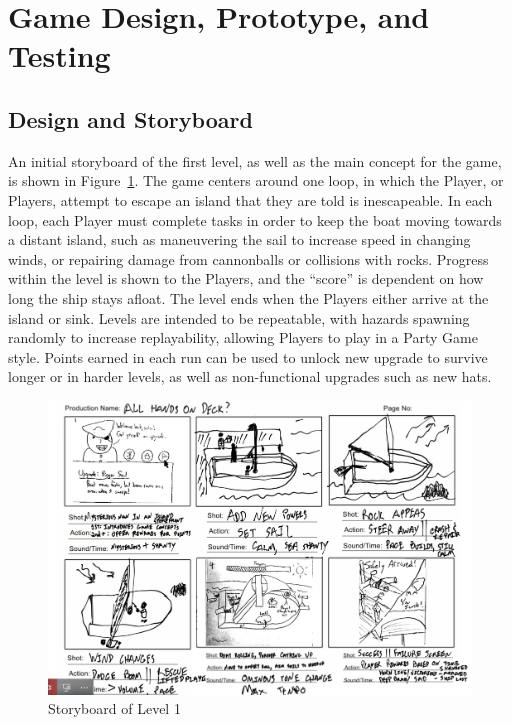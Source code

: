 \section{Game Design, Prototype, and Testing}

\subsection{Design and Storyboard}
An initial storyboard of the first level, as well as the main concept
for the game, is shown in Figure~\ref{fig:storyboard}. The game centers around
one loop, in which the Player, or Players, attempt to escape an island that
they are told is inescapeable. In each loop, each Player must complete tasks
in order to keep the boat moving towards a distant island, such as maneuvering
the sail to increase speed in changing winds, or repairing damage from
cannonballs or collisions with rocks. Progress within the level is shown to the
Players, and the ``score'' is dependent on how long the ship stays afloat. The
level ends when the Players either arrive at the island or sink. Levels are
intended to be repeatable, with hazards spawning randomly to increase
replayability, allowing Players to play in a Party Game style. Points earned
in each run can be used to unlock new upgrade to survive longer or in harder
levels, as well as non-functional upgrades such as new hats. 

\begin{figure}[htbp]
    \centerline{\includegraphics[scale=0.1]{figures/storyboard.png}}
    \caption{Storyboard of Level 1}
    \label{fig:storyboard}
\end{figure}

